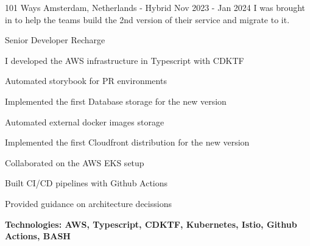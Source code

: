 


\begin{cventries}

{101 Ways}
{Amsterdam, Netherlands - Hybrid}
{Nov 2023 - Jan 2024}
{I was brought in to help the teams build the 2nd version of their service and migrate to it.}
\hfill\begin{minipage}{\dimexpr\textwidth-1cm}
\xdef\tpd{\the\prevdepth}
\begin{cventrystack}
	\cventry
	{Senior Developer} %
	{Recharge} %
	{}
	{}
	{
		\begin{cvitems}
			\item {I developed the AWS infrastructure in Typescript with CDKTF}
			\item {Automated storybook for PR environments}
			\item {Implemented the first Database storage for the new version}
			\item {Automated external docker images storage}
			\item {Implemented the first Cloudfront distribution for the new version}
			\item {Collaborated on the AWS EKS setup}
			\item {Built CI/CD pipelines with Github Actions}
			\item {Provided guidance on architecture decissions}
			\item {\bfseries{Technologies:} AWS, Typescript, CDKTF, Kubernetes, Istio, Github Actions, BASH}
		\end{cvitems}
	}
\end{cventrystack}
\end{minipage}


\end{cventries}
